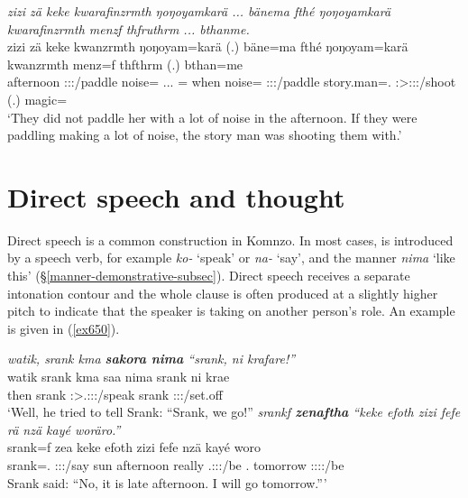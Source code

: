 \begin{exe}
	\ex \emph{zizi zä keke kwarafinzrmth ŋoŋoyamkarä ... bänema fthé ŋoŋoyamkarä kwarafinzrmth menzf thfruthrm ... bthanme.}\\
	\gll zizi zä keke kwanzrmth ŋoŋoyam=karä (.) bäne=ma fthé ŋoŋoyam=karä kwanzrmth menz=f thfthrm (.) bthan=me\\
	afternoon {\Prox} {\Neg} \Stpl:\Sbj:\Pst:\Dur/paddle noise={\Prop} ... \Recog={\Char} when noise={\Prop} \Stpl:\Sbj:\Pst:\Dur/paddle {story.man}=\Erg.{\Sg} \Stsg:\Sbj>\Stpl:\Obj:\Pst:\Dur/shoot (.) magic=\Ins\\
	\trans `They did not paddle her with a lot of noise in the afternoon. If they were paddling making a lot of noise, the story man was shooting them with.'\\
	\label{ex649}
\end{exe}

\section{Direct speech and thought}\label{directspeechthought}

Direct speech is a common construction in Komnzo. In most cases,  is introduced by a speech verb, for example \emph{ko-} `speak' or \emph{na-} `say', and the manner  \emph{nima} `like this' ({\S}\ref{manner-demonstrative-subsec}). Direct speech receives a separate intonation contour and the whole clause is often produced at a slightly higher pitch to indicate that the speaker is taking on another person's role. An example is given in (\ref{ex650}).

\begin{exe}
	\ex 
	\label{ex650}
	\begin{xlist}
		\ex \emph{watik, srank kma \textbf{sakora nima} ``srank, ni krafare!''}\\
		\gll watik srank kma saa nima srank ni krae\\
		then srank {\Pot} \Sg:\Sbj>\Tsg.\Masc:\Obj:\Pst:\Pfv/speak {\Quot} srank {\Fnsg} \Stdu:\Sbj:\Irr:\Pfv/set.off\\
		\trans `Well, he tried to tell Srank: ``Srank, we go!''
		\ex \emph{srankf \textbf{zenaftha} ``keke efoth zizi fefe rä nzä kayé woräro.''}\\
		\gll srank=f zea keke efoth zizi fefe  nzä kayé woro\\
		srank=\Erg.{\Sg} \Sg:\Sbj:\Pst:\Ipfv/say {\Neg} sun afternoon really \Tsg.\F:\Sbj:\Nonpast:\Ipfv/be \Fsg.{\Abs} tomorrow \Fsg:\Sbj:\Nonpast:\Ipfv:\Andat/be\\
		\trans Srank said: ``No, it is late afternoon. I will go tomorrow.'''\\
	\end{xlist}
\end{exe}

